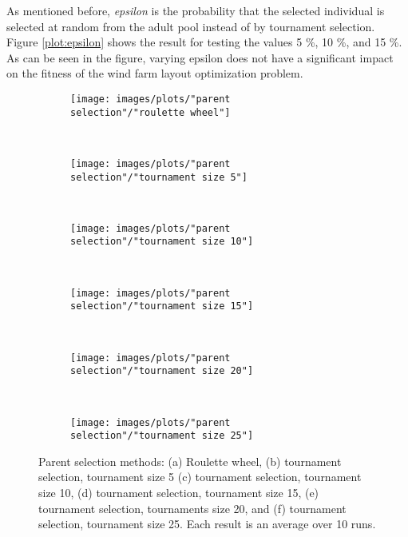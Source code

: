 \noindent As mentioned before, \textit{epsilon} is the probability that the selected individual is selected at random from the adult pool instead of by tournament selection. Figure \ref{plot:epsilon} shows the result for testing the values 5 \%, 10 \%, and 15 \%. As can be seen in the figure, varying epsilon does not have a significant impact on the fitness of the wind farm layout optimization problem.\\


\begin{figure}[h!]
    \centering
    \begin{subfigure}[b]{0.31\textwidth}
        \texttt{[image: images/plots/"parent selection"/"roulette wheel"]}
        \caption{}
        \hfill
        \label{plot:roulette wheel}
    \end{subfigure}
    ~
    \begin{subfigure}[b]{0.31\textwidth}
        \texttt{[image: images/plots/"parent selection"/"tournament size 5"]}
        \caption{}
        \hfill
        \label{plot:tournament size 5}
    \end{subfigure}
    ~
       \begin{subfigure}[b]{0.31\textwidth}
        \texttt{[image: images/plots/"parent selection"/"tournament size 10"]}
        \caption{}
        \hfill
        \label{plot:tournament size 10}
    \end{subfigure}
    ~
       \begin{subfigure}[b]{0.31\textwidth}
        \texttt{[image: images/plots/"parent selection"/"tournament size 15"]}
        \caption{}
        \hfill
        \label{plot:tournament size 15}
    \end{subfigure}
    ~
       \begin{subfigure}[b]{0.31\textwidth}
        \texttt{[image: images/plots/"parent selection"/"tournament size 20"]}
        \caption{}
        \hfill
        \label{plot:tournament size 20}
    \end{subfigure}
    ~
    \begin{subfigure}[b]{0.31\textwidth}
        \texttt{[image: images/plots/"parent selection"/"tournament size 25"]}
        \caption{}
        \hfill
        \label{plot:tournament size 25}
    \end{subfigure}
    \caption{Parent selection methods: (a) Roulette wheel, (b) tournament selection, tournament size 5 (c) tournament selection, tournament size 10, (d) tournament selection, tournament size 15, (e) tournament selection, tournaments size 20, and (f) tournament selection, tournament size 25. Each result is an average over 10 runs.}
    \label{plot:parent selection}
\end{figure}


